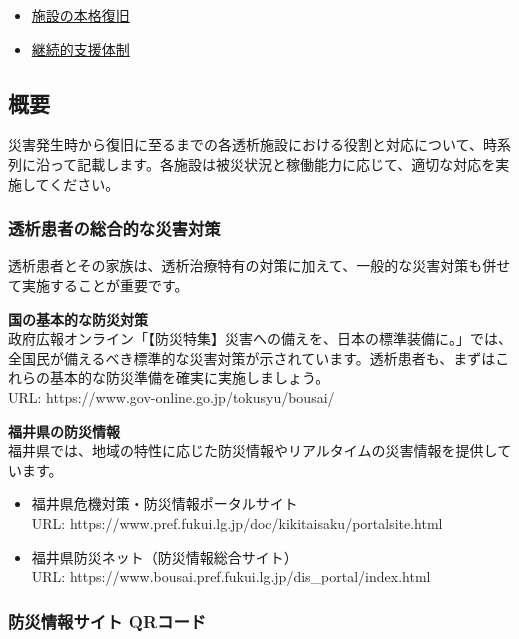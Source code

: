 \documentclass[
  japanese,
  letterpaper,
  DIV=11,
  numbers=noendperiod]{scrartcl}
\providecommand{\tightlist}{%
  \setlength{\itemsep}{0pt}\setlength{\parskip}{0pt}}
\begin{document}
\begin{itemize}
  \begin{itemize}
  \tightlist
  \item
    \hyperref[ux65bdux8a2dux306eux672cux683cux5fa9ux65e7]{施設の本格復旧}
  \item
    \hyperref[ux7d99ux7d9aux7684ux652fux63f4ux4f53ux5236]{継続的支援体制}
  \end{itemize}
\end{itemize}

\subsection{概要}\label{ux6982ux8981}

災害発生時から復旧に至るまでの各透析施設における役割と対応について、時系列に沿って記載します。各施設は被災状況と稼働能力に応じて、適切な対応を実施してください。

\subsubsection{透析患者の総合的な災害対策}\label{ux900fux6790ux60a3ux8005ux306eux7dcfux5408ux7684ux306aux707dux5bb3ux5bfeux7b56}

透析患者とその家族は、透析治療特有の対策に加えて、一般的な災害対策も併せて実施することが重要です。

\textbf{国の基本的な防災対策}\\
政府広報オンライン「【防災特集】災害への備えを、日本の標準装備に。」では、全国民が備えるべき標準的な災害対策が示されています。透析患者も、まずはこれらの基本的な防災準備を確実に実施しましょう。\\
URL: https://www.gov-online.go.jp/tokusyu/bousai/

\textbf{福井県の防災情報}\\
福井県では、地域の特性に応じた防災情報やリアルタイムの災害情報を提供しています。

\begin{itemize}
\item
  福井県危機対策・防災情報ポータルサイト\\
  URL: https://www.pref.fukui.lg.jp/doc/kikitaisaku/portalsite.html
\item
  福井県防災ネット（防災情報総合サイト）\\
  URL: https://www.bousai.pref.fukui.lg.jp/dis\_portal/index.html
\end{itemize}

\subsubsection{防災情報サイト
QRコード}\label{ux9632ux707dux60c5ux5831ux30b5ux30a4ux30c8-qrux30b3ux30fcux30c9}
\end{document}
